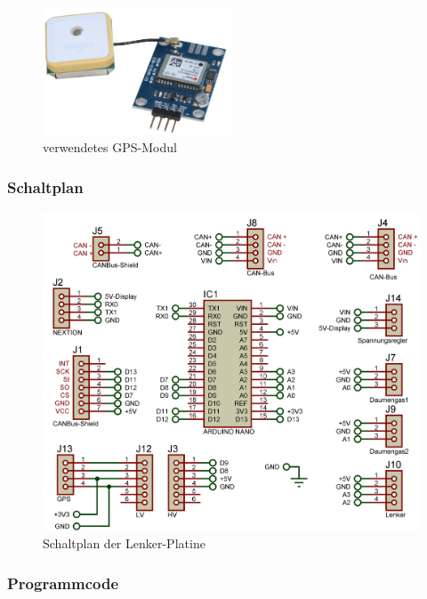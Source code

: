 \begin{figure}[h]
    \centering
    \includegraphics[width=0.5\textwidth]{Fotos/GPS_Modul.png}
    \caption{verwendetes GPS-Modul}
\end{figure}

\newpage
\subsubsection{Schaltplan}
\begin{figure}[h]
    \centering
    \includegraphics[width=1.0\textwidth]{../Proteus/Exports/Lenker-Platine.png}    
    \caption{Schaltplan der Lenker-Platine}
\end{figure}

\newpage
\subsubsection{Programmcode}

\newpage

